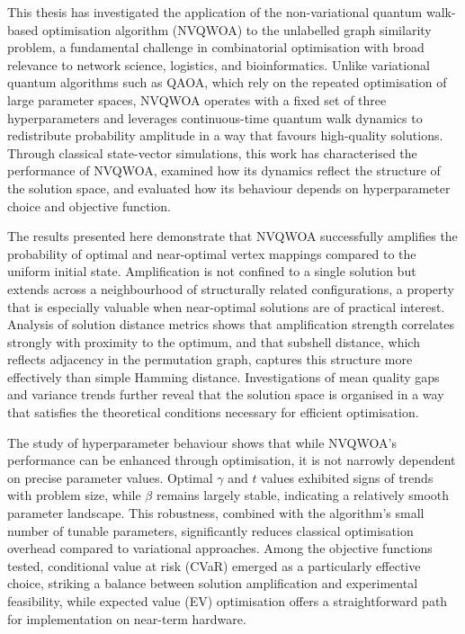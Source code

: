 This thesis has investigated the application of the non-variational quantum walk-based optimisation algorithm (NVQWOA) to the unlabelled graph similarity problem, a fundamental challenge in combinatorial optimisation with broad relevance to network science, logistics, and bioinformatics. Unlike variational quantum algorithms such as QAOA, which rely on the repeated optimisation of large parameter spaces, NVQWOA operates with a fixed set of three hyperparameters and leverages continuous-time quantum walk dynamics to redistribute probability amplitude in a way that favours high-quality solutions. Through classical state-vector simulations, this work has characterised the performance of NVQWOA, examined how its dynamics reflect the structure of the solution space, and evaluated how its behaviour depends on hyperparameter choice and objective function.

The results presented here demonstrate that NVQWOA successfully amplifies the probability of optimal and near-optimal vertex mappings compared to the uniform initial state. Amplification is not confined to a single solution but extends across a neighbourhood of structurally related configurations, a property that is especially valuable when near-optimal solutions are of practical interest. Analysis of solution distance metrics shows that amplification strength correlates strongly with proximity to the optimum, and that subshell distance, which reflects adjacency in the permutation graph, captures this structure more effectively than simple Hamming distance. Investigations of mean quality gaps and variance trends further reveal that the solution space is organised in a way that satisfies the theoretical conditions necessary for efficient optimisation.

The study of hyperparameter behaviour shows that while NVQWOA's performance can be enhanced through optimisation, it is not narrowly dependent on precise parameter values. Optimal $\gamma$ and $t$ values exhibited signs of trends with problem size, while $\beta$ remains largely stable, indicating a relatively smooth parameter landscape. This robustness, combined with the algorithm's small number of tunable parameters, significantly reduces classical optimisation overhead compared to variational approaches. Among the objective functions tested, conditional value at risk (CVaR) emerged as a particularly effective choice, striking a balance between solution amplification and experimental feasibility, while expected value (EV) optimisation offers a straightforward path for implementation on near-term hardware.

